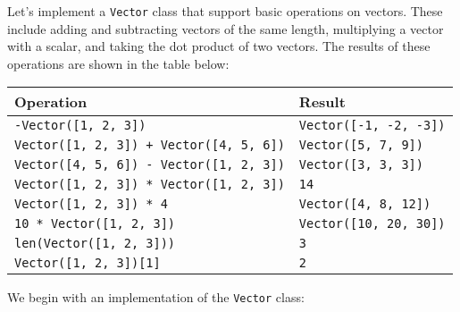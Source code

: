 Let's implement a {\tt Vector} class that support basic operations on
vectors. These include adding and subtracting vectors of the same length,
multiplying a vector with a scalar, and taking the dot product of two
vectors. The results of these operations are shown in the table below:

\begin{center}
  \begin{tabular}{ l | l }
Operation & Result \\
\hline
{\tt -Vector([1, 2, 3])               } & {\tt Vector([-1, -2, -3])} \\
{\tt Vector([1, 2, 3]) + Vector([4, 5, 6])} & {\tt Vector([5, 7, 9])} \\
{\tt Vector([4, 5, 6]) - Vector([1, 2, 3])} & {\tt Vector([3, 3, 3])} \\
{\tt Vector([1, 2, 3]) * Vector([1, 2, 3])} & {\tt 14} \\
{\tt Vector([1, 2, 3]) * 4              } & {\tt Vector([4, 8, 12])} \\
{\tt 10 * Vector([1, 2, 3])             } & {\tt Vector([10, 20, 30])} \\
{\tt len(Vector([1, 2, 3]))             } & {\tt 3} \\
{\tt Vector([1, 2, 3])[1]               } & {\tt 2}
  \end{tabular}
\end{center}

We begin with an implementation of the {\tt Vector} class:



